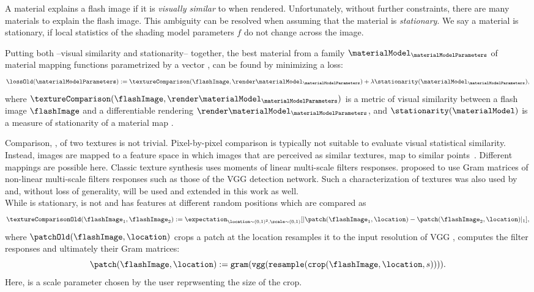 \documentclass[acmtog, review, anonymous]{acmart}
\begin{document}
A material \materialModel explains a flash image \flashImage if it is \emph{visually similar} to \flashImage when rendered.
Unfortunately, without further constraints, there are many materials to explain the flash image.
This ambiguity can be resolved when assuming that the material \materialModel is \emph{stationary}.
We say a material is stationary, if local statistics of the shading model parameters $f$ do not change across the image.
  
Putting both --visual similarity and stationarity-- together, the best material from a family $\materialModel_\materialModelParameters$ of material mapping functions parametrized by a vector \materialModelParameters, can be found by minimizing a loss:
\begin{align}
\label{eq:ImageLoss}
\lossOld(\materialModelParameters):=
\textureComparison(
\flashImage,
\render\materialModel_\materialModelParameters)
+
\lambda
\stationarity(\materialModel_\materialModelParameters)
,
\end{align}
where $\textureComparison(\flashImage,\render\materialModel_\materialModelParameters)$ is a metric of visual similarity between a flash image $\flashImage$ and a differentiable rendering $\render\materialModel_\materialModelParameters$, and $\stationarity(\materialModel)$ is a measure of stationarity of a material map \materialModel.

Comparison, \textureComparison, of two textures is not trivial.
Pixel-by-pixel comparison is typically not suitable to evaluate visual statistical similarity.
Instead, images are mapped to a feature space in which images that are perceived as similar textures, map to similar points~\cite{portilla2000parametric}.
Different mappings are possible here.
Classic texture synthesis \cite{heeger1995pyramid} uses moments of linear multi-scale filters responses.
\citet{gatys2015texture} proposed to use Gram matrices of non-linear multi-scale filters responses such as those of the VGG \cite{simonyan2014very} detection network.
Such a characterization of textures was also used by \citet{aittala2016reflectance} and, without loss of generality, will be used and extended in this work as well.\\
While \materialModel is stationary, \flashImage is not and has features at different random positions \location which are compared as
\begin{equation}
\textureComparisonOld(\flashImage_1,\flashImage_2)
:=
\expectation_{\location\sim(0,1)^2,\scale\sim(0,1)}[
|
\patch(\flashImage_1,\location)
-
\patch(\flashImage_2,\location)
|_1 ],
\end{equation}
where $\patchOld(\flashImage, \location)$ crops a patch at the location \location resamples it to the input resolution of VGG \cite{simonyan2014very}, computes the filter responses and ultimately their Gram matrices:
\begin{equation}
\patch(\flashImage,\location):=
\mathtt{gram}(\mathtt{vgg}(\mathtt{resample}(\mathtt{crop}(\flashImage,\location, s)))).
\end{equation}
Here, \scale is a scale parameter chosen by the user reprwsenting the size of the crop.
\end{document}
